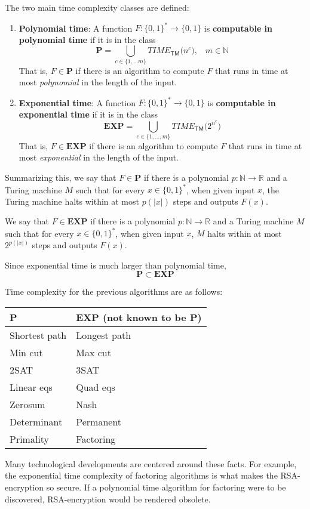   \begin{definition}
  The two main time complexity classes are defined: 
  \begin{enumerate}
      \item \textbf{Polynomial time}: A function $F: \{0,1\}^* \longrightarrow \{0,1\}$ is \textbf{computable in polynomial time} if it is in the class
      \[\mathbf{P} = \bigcup_{c \in \{1, ...m\}} TIME_{\mathsf{TM}} \big( n^c \big), \;\;\; m \in \mathbb{N}\]
      That is, $F \in \mathbf{P}$ if there is an algorithm to compute $F$ that runs in time at most \textit{polynomial} in the length of the input. 
      \item \textbf{Exponential time}: A function $F: \{0,1\}^* \longrightarrow \{0,1\}$ is \textbf{computable in exponential time} if it is in the class 
      \[\mathbf{EXP} = \bigcup_{c \in \{1, ..., m\}} TIME_{\mathsf{TM}} \big( 2^{n^c}\big)\]
      That is, $F \in \mathbf{EXP}$ if there is an algorithm to compute $F$ that runs in time at most \textit{exponential} in the length of the input. 
  \end{enumerate}
  Summarizing this, we say that $F \in \mathbf{P}$ if there is a polynomial $p: \mathbb{N} \longrightarrow \mathbb{R}$ and a Turing machine $M$ such that for every $x \in \{0,1\}^*$, when given input $x$, the Turing machine halts within at most $p(|x|)$ steps and outputs $F(x)$. 

  We say that $F \in \mathbf{EXP}$ if there is a polynomial $p: \mathbb{N} \longrightarrow \mathbb{R}$ and a Turing machine $M$ such that for every $x \in \{0,1\}^*$, when given input $x$, $M$ halts within at most $2^{p(|x|)}$ steps and outputs $F(x)$. 
  \end{definition}

  \begin{lemma}
  Since exponential time is much larger than polynomial time, 
  \[\mathbf{P} \subset \mathbf{EXP}\]
  \end{lemma}

  Time complexity for the previous algorithms are as follows: 
  \begin{center}
  \begin{tabular}{l|l}
      \textbf{P} & \textbf{EXP} (not known to be \textbf{P}) \\
      \hline
      Shortest path & Longest path \\
      Min cut & Max cut \\
      2SAT & 3SAT \\
      Linear eqs & Quad eqs \\
      Zerosum & Nash \\
      Determinant & Permanent\\
      Primality & Factoring
  \end{tabular}
  \end{center}
  Many technological developments are centered around these facts. For example, the exponential time complexity of factoring algorithms is what makes the RSA-encryption so secure. If a polynomial time algorithm for factoring were to be discovered, RSA-encryption would be rendered obsolete. 

